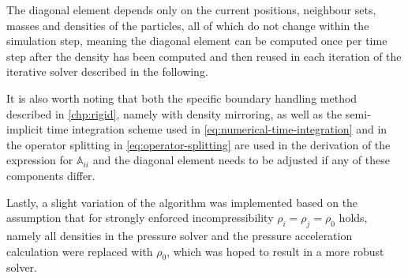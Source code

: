 \documentclass[oneside, a4paper]{book}
\newcommand\vek[1]{\vec{\bm{#1}}}
\newcommand\br[1]{\left(#1\right)}
\begin{document}
    
    The diagonal element depends only on the current positions, neighbour sets, masses and densities of the particles, all of which do not change within the simulation step, meaning the diagonal element can be computed once per time step after the density has been computed and then reused in each iteration of the iterative solver described in the following. 
    
    It is also worth noting that both the specific boundary handling method described in \autoref{chp:rigid}, namely \autocite[consistent boundaries]{consistent-boundaries} with density mirroring, as well as the semi-implicit time integration scheme used in \autoref{eq:numerical-time-integration} and in the operator splitting in \autoref{eq:operator-splitting} are used in the derivation of the expression for $\mathds{A}_{ii}$ and the diagonal element needs to be adjusted if any of these components differ.

    Lastly, a slight variation of the algorithm was implemented based on the assumption that for strongly enforced incompressibility $\rho_i=\rho_j=\rho_0$ holds, namely all densities in the pressure solver and the pressure acceleration calculation were replaced with $\rho_0$, which was hoped to result in a more robust solver. 
\end{document}
